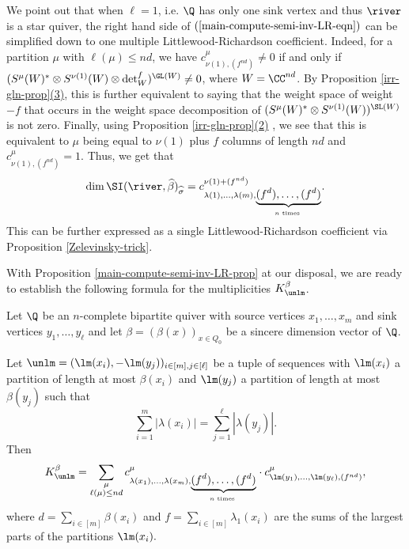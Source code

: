 \begin{remark}\label{main-compute-one-sink-rmk} We point out that when $\ell=1$, i.e. $\Q$ has only one sink vertex and thus $\river$ is a star quiver, the right hand side of $(\ref{main-compute-semi-inv-LR-eqn})$ can be simplified down to one multiple Littlewood-Richardson coefficient. Indeed, for a partition $\mu$ with $\ell(\mu) \leq nd$, we have $c^{\mu}_{\nu(1), (f^{nd})}\neq 0$ if and only if $(S^{\mu}(W)^*\otimes S^{\nu(1)}(W)\otimes \det_W^f)^{\GL(W)}\neq 0$, where $W=\CC^{nd}$.  By Proposition \hyperlink{irr-gln-prop-3}{\ref{irr-gln-prop}(3)}, this is further equivalent to saying that the weight space of weight $-f$ that occurs in the weight space decomposition of $(S^{\mu}(W)^*\otimes S^{\nu(1)}(W))^{\SL(W)}$ is not zero. Finally, using Proposition \hyperlink{irr-gln-prop-3}{\ref{irr-gln-prop}(2)} , we see that this is equivalent to $\mu$ being equal to $\nu(1)$ plus $f$ columns of length $nd$ and $c^{\mu}_{\nu(1), (f^{nd})}=1$.  Thus, we get that
$$
\dim \SI(\river, \widehat{\beta})_{\widehat{\sigma}}=c^{\nu(1)+(f^{nd})}_{\lambda(1), \ldots, \lambda(m), \underbrace{ (f^d),\ldots, (f^d)}_{n \text{ times }}}.
$$
This can be further expressed as a single Littlewood-Richardson coefficient via Proposition \ref{Zelevinsky-trick}. 
\end{remark}

With Proposition \ref{main-compute-semi-inv-LR-prop} at our disposal, we are ready to establish the following formula for the multiplicities $K^{\beta}_{\unlm}$. 

\begin{theorem} \label{main-formula-mult-thm} Let $\Q$ be an $n$-complete bipartite quiver with source vertices $x_1, \ldots, x_m$ and sink vertices $y_1, \ldots, y_\ell$ and let $\beta=(\beta(x))_{x \in Q_0}$ be a sincere dimension vector of $\Q$. 

Let $\unlm=(\lm(x_i), -\lm(y_j))_{i \in [m], j \in [\ell] }$ be a tuple of sequences with $\lm(x_i)$ a partition of length at most $\beta(x_i)$ and $\lm(y_j)$ a partition of length at most $\beta(y_j)$ such that
$$
\sum_{i=1}^m |\lambda(x_i)|=\sum_{j=1}^{\ell} |\lambda(y_j)|.
$$
Then
\begin{equation}\label{main-formula-mult}
K^{\beta}_{\unlm}=\sum_{\substack{\mu\\ \ell(\mu)\leq nd}} c^\mu_{\lambda(x_1),\ldots, \lambda(x_m), \underbrace{(f^d),\ldots, (f^d)}_{n \text{ times }}} \cdot c^\mu_{\lm(y_1),\ldots, \lm(y_\ell),(f^{nd})},
\end{equation}
where $\displaystyle{d=\sum_{i \in [m]}\beta(x_i)}$ and $\displaystyle{f=\sum_{i \in [m]} \lambda_1(x_i)}$ are the sums of the largest parts of the partitions $\lm(x_i).$
\end{theorem}

